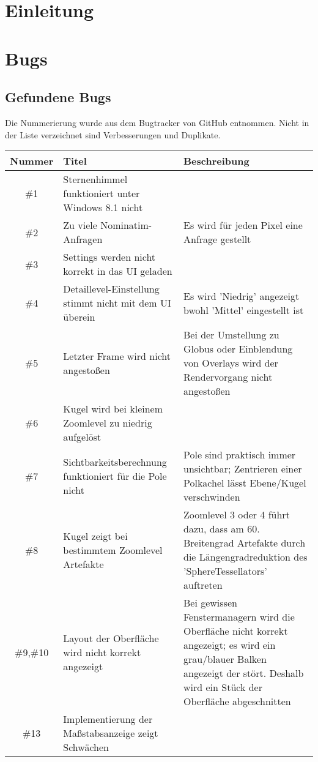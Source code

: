 \documentclass[10pt]{scrreprt}
\begin{document}
\pagebreak
\rmfamily
\tableofcontents

\chapter{Einleitung}

\chapter{Bugs}
\section{Gefundene Bugs}
Die Nummerierung wurde aus dem Bugtracker von GitHub entnommen.
Nicht in der Liste verzeichnet sind Verbesserungen und Duplikate.
\begin{longtable}{|c|p{5.2cm}|p{8.2cm}|}
\hline
Nummer & Titel & Beschreibung \\
\hline
\hline
\#1 & Sternenhimmel funktioniert unter Windows 8.1 nicht & \\
\hline
\#2 & Zu viele Nominatim-Anfragen & Es wird für jeden Pixel eine Anfrage gestellt \\
\hline
\#3 & Settings werden nicht korrekt in das UI geladen & \\
\hline
\#4 & Detaillevel-Einstellung stimmt nicht mit dem UI überein & Es wird 'Niedrig' angezeigt
 bwohl 'Mittel' eingestellt ist \\
\hline
\#5 & Letzter Frame wird nicht angestoßen & Bei der Umstellung zu Globus oder Einblendung von Overlays wird der Rendervorgang nicht angestoßen\\
\hline
\#6 & Kugel wird bei kleinem Zoomlevel zu niedrig aufgelöst & \\
\hline
\#7 & Sichtbarkeitsberechnung funktioniert für die Pole nicht & Pole sind praktisch immer unsichtbar; Zentrieren einer Polkachel lässt Ebene/Kugel verschwinden \\
\hline
\#8 & Kugel zeigt bei bestimmtem Zoomlevel Artefakte & Zoomlevel 3 oder 4 führt dazu, dass am 60. Breitengrad Artefakte durch die Längengradreduktion des 'SphereTessellators' auftreten \\
\hline
\#9,\#10 & Layout der Oberfläche wird nicht korrekt angezeigt & Bei gewissen Fenstermanagern wird die Oberfläche nicht korrekt angezeigt; es wird ein grau/blauer Balken angezeigt der stört. Deshalb wird ein Stück der Oberfläche abgeschnitten \\
\hline
\#13 & Implementierung der Maßstabsanzeige zeigt Schwächen & \\

\end{longtable}
\end{document}
